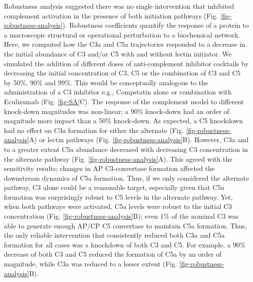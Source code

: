 \documentclass[12pt]{article}
\begin{document}
Robustness analysis suggested there was no single intervention that inhibited complement activation in the presence of both initiation pathways (Fig. \ref{fig-robustness-analysis}).
Robustness coefficients quantify the response of a protein to a macroscopic structural or operational perturbation to a biochemical network.
Here, we computed how the C3a and C5a trajectories responded to a decrease in the initial abundance of C3 and/or C5 with and without lectin initiator.
We simulated the addition of different doses of anti-complement inhibitor cocktails by decreasing the initial concentration of C3, C5 or the combination of C3 and C5 by 50\%, 90\% and 99\%.
This would be conceptually analogous to the administration of a C3 inhibitor e.g., Compstatin alone or combination with Eculizumab (Fig. \ref{fig-SA}C).
The response of the complement model to different knock-down magnitudes was non-linear; a 90\% knock-down had an order of magnitude more impact than a 50\% knock-down.
As expected, a C5 knockdown had no effect on C3a formation for either the alternate (Fig. \ref{fig-robustness-analysis}A) or lectin pathways
(Fig. \ref{fig-robustness-analysis}B).
However, C3a and to a greater extent C5a abundance decreased with decreasing C3 concentration in the alternate pathway (Fig. \ref{fig-robustness-analysis}A).
This agreed with the sensitivity results; changes in AP C3-convertase formation affected the downstream dynamics of C5a formation.
Thus, if we only considered the alternate pathway, C3 alone could be a reasonable target, especially given that C5a formation was surprisingly robust to C5 levels in the alternate pathway.
Yet, when both pathways were activated, C5a levels were robust to the initial C3 concentration (Fig. \ref{fig-robustness-analysis}B);
even 1\% of the nominal C3 was able to generate enough AP/CP C5 convertase to maintain C5a formation.
Thus, the only reliable intervention that consistently reduced both C3a and C5a formation for all cases was a knockdown of both C3 and C5.
For example, a 90\% decrease of both C3 and C5 reduced the formation of C5a by an order of magnitude,
while C3a was reduced to a lesser extent (Fig. \ref{fig-robustness-analysis}B).

\end{document}

